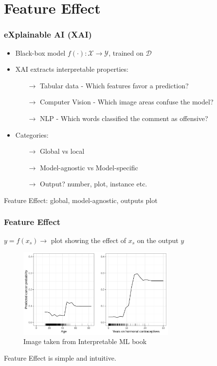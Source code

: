 \documentclass{beamer}
\begin{document}
\section{Feature Effect}
\begin{frame}
  \frametitle{eXplainable AI (XAI)}
  \begin{itemize}
  \item Black-box model \(f(\cdot): \mathcal{X} \rightarrow \mathcal{Y} \), trained on \(\mathcal{D}\)
    \vspace{3mm}

    \item XAI extracts interpretable properties:
    \begin{itemize}
    \item[\(\rightarrow\)] Tabular data - Which features favor a prediction?
    \item[\(\rightarrow\)] Computer Vision - Which image areas confuse the model?
    \item[\(\rightarrow\)] NLP - Which words classified the comment as offensive?
    \end{itemize}

  \vspace{3mm}

    \item Categories:
      \begin{itemize}
        \item[\(\rightarrow\)] Global vs local
        \item[\(\rightarrow\)] Model-agnostic vs Model-specific
        \item[\(\rightarrow\)] Output? number, plot, instance etc.
      \end{itemize}
  \end{itemize}

  \noindent\makebox[\linewidth]{\rule{\paperwidth}{0.4pt}}
  Feature Effect: global, model-agnostic, outputs plot
\end{frame}

\begin{frame}
  \frametitle{Feature Effect}
  \(y = f(x_s) \rightarrow\) plot showing the effect of \(x_s\) on the output \(y\)
  \vspace{2mm}
  \begin{figure}[ht]
    \centering
    \includegraphics[width=0.7\textwidth]{./figures/pdp-cervical-1.jpeg}
    \caption{Image taken from Interpretable ML book~\citep{molnar2022}}
  \end{figure}

  \noindent\makebox[\linewidth]{\rule{\paperwidth}{0.4pt}}
  Feature Effect is simple and intuitive.
\end{frame}
\end{document}
